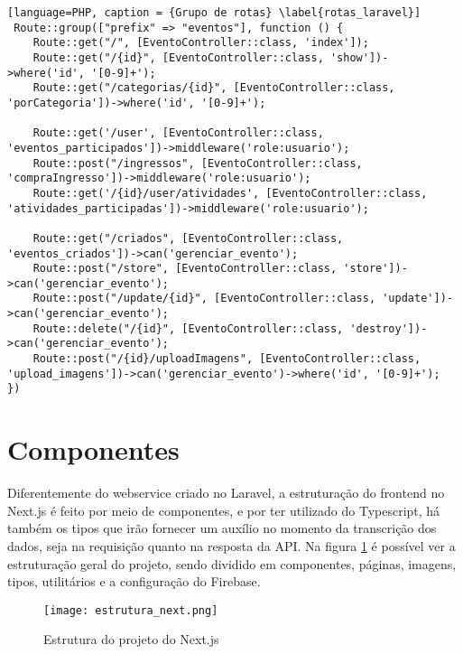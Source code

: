 \begin{lstlisting}[language=PHP, caption = {Grupo de rotas} \label{rotas_laravel}]
 Route::group(["prefix" => "eventos"], function () {
    Route::get("/", [EventoController::class, 'index']);
    Route::get("/{id}", [EventoController::class, 'show'])->where('id', '[0-9]+');
    Route::get("/categorias/{id}", [EventoController::class, 'porCategoria'])->where('id', '[0-9]+');

    Route::get('/user', [EventoController::class, 'eventos_participados'])->middleware('role:usuario');
    Route::post("/ingressos", [EventoController::class, 'compraIngresso'])->middleware('role:usuario');
    Route::get('/{id}/user/atividades', [EventoController::class, 'atividades_participadas'])->middleware('role:usuario');

    Route::get("/criados", [EventoController::class, 'eventos_criados'])->can('gerenciar_evento');
    Route::post("/store", [EventoController::class, 'store'])->can('gerenciar_evento');
    Route::post("/update/{id}", [EventoController::class, 'update'])->can('gerenciar_evento');
    Route::delete("/{id}", [EventoController::class, 'destroy'])->can('gerenciar_evento');
    Route::post("/{id}/uploadImagens", [EventoController::class, 'upload_imagens'])->can('gerenciar_evento')->where('id', '[0-9]+');
})
\end{lstlisting}

\section{Componentes}
Diferentemente do webservice criado no Laravel, a estruturação do frontend no Next.js é feito por meio de componentes, e por ter utilizado do Typescript, há também os tipos que irão fornecer um auxílio no momento da transcrição dos dados, seja na requisição quanto na resposta da API. Na figura \ref{estrutura_next} é possível ver a estruturação geral do projeto, sendo dividido em componentes, páginas, imagens, tipos, utilitários e a configuração do Firebase.
\begin{figure}[H]
    \caption{\label{estrutura_next}Estrutura do projeto do Next.js}
    \vspace{5pt}
    \centering
    \texttt{[image: estrutura\_next.png]}
    \vspace{5pt}
\end{figure}

